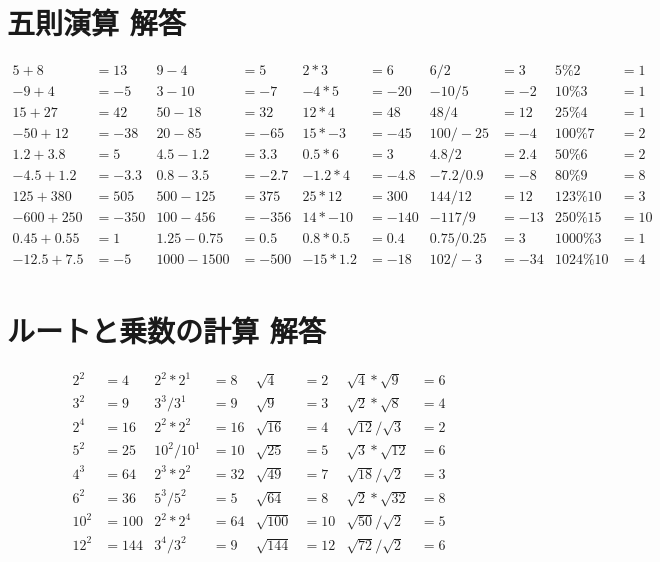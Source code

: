 \documentclass[paper=b4j,landscape,twocolumn,fleqn]{jlreq}
\begin{document}
\section{五則演算 解答}
\begin{align*}
5+8&=13 & 9-4&=5 & 2*3&=6 & 6/2&=3 & 5\%2&=1\\
-9+4&=-5 & 3-10&=-7 & -4*5&=-20 & -10/5&=-2 & 10\%3&=1\\
15+27&=42 & 50-18&=32 & 12*4&=48 & 48/4&=12 & 25\%4&=1\\
-50+12&=-38 & 20-85&=-65 & 15*-3&=-45 & 100/-25&=-4 & 100\%7&=2\\
1.2+3.8&=5 & 4.5-1.2&=3.3 & 0.5*6&=3 & 4.8/2&=2.4 & 50\%6&=2\\
-4.5+1.2&=-3.3 & 0.8-3.5&=-2.7 & -1.2*4&=-4.8 & -7.2/0.9&=-8 & 80\%9&=8\\
125+380&=505 & 500-125&=375 & 25*12&=300 & 144/12&=12 & 123\%10&=3\\
-600+250&=-350 & 100-456&=-356 & 14*-10&=-140 & -117/9&=-13 & 250\%15&=10\\
0.45+0.55&=1 & 1.25-0.75&=0.5 & 0.8*0.5&=0.4 & 0.75/0.25&=3 & 1000\%3&=1\\
-12.5+7.5&=-5 & 1000-1500&=-500 & -15*1.2&=-18 & 102/-3&=-34 & 1024\%10&=4
\end{align*}

\section{ルートと乗数の計算 解答}
\begin{align*}
2^2&=4 & 2^2*2^1&=8 & \sqrt{4}&=2 & \sqrt{4}*\sqrt{9}&=6\\
3^2&=9 & 3^3/3^1&=9 & \sqrt{9}&=3 & \sqrt{2}*\sqrt{8}&=4\\
2^4&=16 & 2^2*2^2&=16 & \sqrt{16}&=4 & \sqrt{12}/\sqrt{3}&=2\\
5^2&=25 & 10^2/10^1&=10 & \sqrt{25}&=5 & \sqrt{3}*\sqrt{12}&=6\\
4^3&=64 & 2^3*2^2&=32 & \sqrt{49}&=7 & \sqrt{18}/\sqrt{2}&=3\\
6^2&=36 & 5^3/5^2&=5 & \sqrt{64}&=8 & \sqrt{2}*\sqrt{32}&=8\\
10^2&=100 & 2^2*2^4&=64 & \sqrt{100}&=10 & \sqrt{50}/\sqrt{2}&=5\\
12^2&=144 & 3^4/3^2&=9 & \sqrt{144}&=12 & \sqrt{72}/\sqrt{2}&=6
\end{align*}
\end{document}
